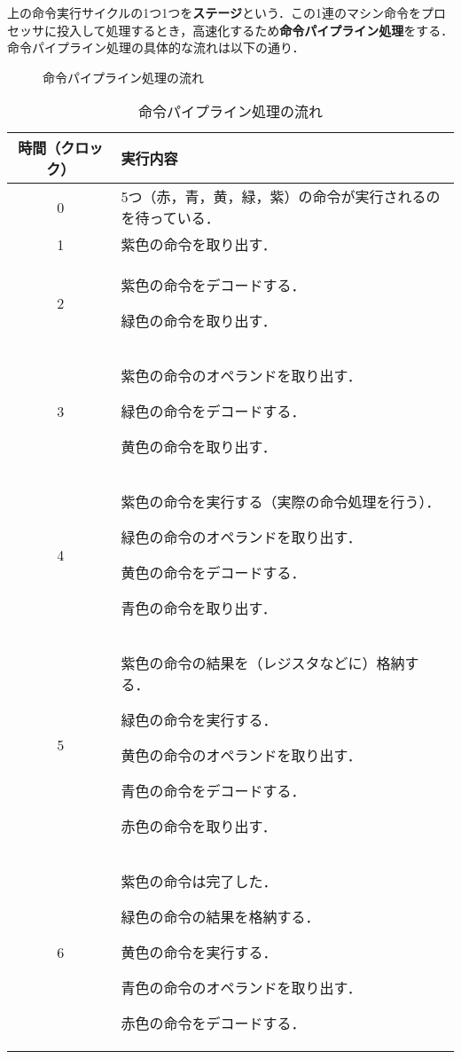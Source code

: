 上の命令実行サイクルの1つ1つを\textbf{ステージ}という．この1連のマシン命令をプロセッサに投入して処理するとき，高速化するため\textbf{命令パイプライン処理}をする．命令パイプライン処理の具体的な流れは以下の通り．

\begin{figure}[H]
	\begin{center}
		\caption{命令パイプライン処理の流れ}
		\label{fig:com_arch-3}
	\end{center}
\end{figure}

\begin{table}[H]
	\caption{命令パイプライン処理の流れ}
	\label{tab:com_arch-1}
	\centering
	\scriptsize
	\begin{tabular}{c|p{10cm}}
		\hline
		時間（クロック） & 実行内容\\
		\hline
		0 & 5つ（赤，青，黄，緑，紫）の命令が実行されるのを待っている．\\
		\hline
		1 & 紫色の命令を取り出す．\\
		\hline
		2 & 紫色の命令をデコードする．\par 緑色の命令を取り出す．\\
		\hline
		3 & 紫色の命令のオペランドを取り出す．\par 緑色の命令をデコードする．\par 黄色の命令を取り出す．\\
		\hline
		4 & 紫色の命令を実行する（実際の命令処理を行う）．\par 緑色の命令のオペランドを取り出す．\par 黄色の命令をデコードする．\par 青色の命令を取り出す．\\
		\hline
		5 & 紫色の命令の結果を（レジスタなどに）格納する．\par 緑色の命令を実行する．\par 黄色の命令のオペランドを取り出す．\par 青色の命令をデコードする．\par 赤色の命令を取り出す．\\
		\hline
		6 & 紫色の命令は完了した．\par 緑色の命令の結果を格納する．\par 黄色の命令を実行する．\par 青色の命令のオペランドを取り出す．\par 赤色の命令をデコードする．\\

\end{tabular}
\end{table}
